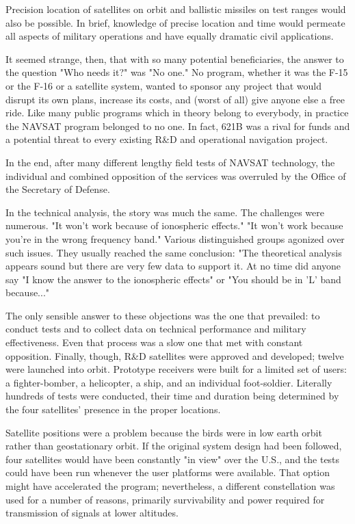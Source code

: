 Precision location of satellites on orbit and ballistic missiles on test ranges would also be possible. In brief, knowledge of precise location and time would permeate all aspects of military operations and have equally dramatic civil applications.

It seemed strange, then, that with so many potential beneficiaries, the answer to the question "Who needs it?" was "No one." No program, whether it was the F-15 or the F-16 or a satellite system, wanted to sponsor any project that would disrupt its own plans, increase its costs, and (worst of all) give anyone else a free ride. Like many public programs which in theory belong to everybody, in practice the NAVSAT program belonged to no one. In fact, 621B was a rival for funds and a potential threat to every existing R\&D and operational navigation project.

In the end, after many different lengthy field tests of NAVSAT technology, the individual and combined opposition of the services was overruled by the Office of the Secretary of Defense.

In the technical analysis, the story was much the same. The challenges were numerous. "It won't work because of ionospheric effects." "It won't work because you're in the wrong frequency band." Various distinguished groups agonized over such issues. They usually reached the same conclusion: "The theoretical analysis appears sound but there are very few data to support it. At no time did anyone say "I know the answer to the ionospheric effects" or "You should be in 'L' band because..."

The only sensible answer to these objections was the one that prevailed: to conduct tests and to collect data on technical performance and military effectiveness. Even that process was a slow one that met with constant opposition. Finally, though, R\&D satellites were approved and developed; twelve were launched into orbit. Prototype receivers were built for a limited set of users: a fighter-bomber, a helicopter, a ship, and an individual foot-soldier. Literally hundreds of tests were conducted, their time and duration being determined by the four satellites' presence in the proper locations.

Satellite positions were a problem because the birds were in low earth orbit rather than geostationary orbit. If the original system design had been followed, four satellites would have been constantly "in view" over the U.S., and the tests could have been run whenever the user platforms were available. That option might have accelerated the program; nevertheless, a different constellation was used for a number of reasons, primarily survivability and power required for transmission of signals at lower altitudes.

